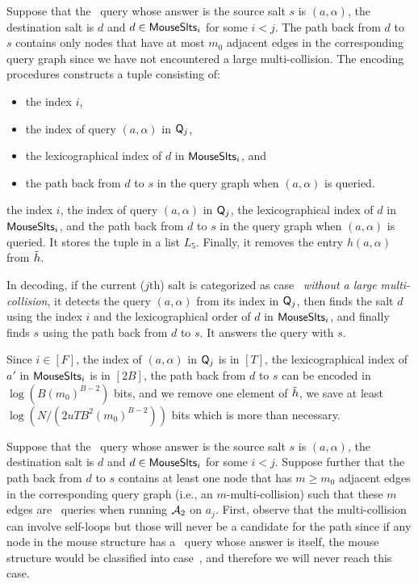  Suppose that the \new\ query whose answer is the source salt $s$ is $(a,\alpha)$, the destination salt is $d$ and  $d\in \mathsf{MouseSlts}_i$ for some $i<j$. The path back from $d$ to $s$ contains only nodes that have at most $m_0$ adjacent edges in the corresponding query graph since we have not encountered a large multi-collision.
The encoding procedures constructs a tuple consisting of\ifnum{}:
\begin{itemize}
  \item the index $i$,
  \item the index of query $(a,\alpha)$ in $\mathsf{Q}_j$,
  \item the lexicographical index of $d$ in $\mathsf{MouseSlts}_i$, and 
  \item the path back from $d$ to $s$ in the query graph when $(a,\alpha)$ is queried.
\end{itemize}
\else
the index $i$,
  the index of query $(a,\alpha)$ in $\mathsf{Q}_j$, the lexicographical index of $d$ in $\mathsf{MouseSlts}_i$, and the path back from $d$ to $s$ in the query graph when $(a,\alpha)$ is queried.
\fi
 It stores the tuple in a list $L_5$. Finally, it removes the entry $h(a,\alpha)$ from $\tilde{h}$.

In decoding, if  the current ($j$th) salt is categorized as case~ \emph{without a large multi-collision}, it  detects the query $(a,\alpha)$ from its index in $\mathsf{Q}_j$, then finds the salt $d$ using the index $i$ and the lexicographical order of $d$ in $\mathsf{MouseSlts}_i$, and finally finds $s$ using the path back from $d$ to $s$. It answers the query with  $s$.

Since $i\in [F]$, the index of $(a,\alpha)$ in $\mathsf{Q}_j$ is in $[T]$, the lexicographical index of $a'$ in $\mathsf{MouseSlts}_i$ is in $[2B]$, the path back from $d$ to $s$ can be encoded in $\log (B(m_0)^{B-2})$ bits, and we remove one element of $\tilde{h}$, we save at least $\log (N/(2uTB^2(m_0)^{B-2}))$ bits which is more than necessary.





Suppose that the \new\ query whose answer is the source salt $s$ is $(a,\alpha)$, the destination salt is $d$ and  $d\in \mathsf{MouseSlts}_i$ for some $i<j$. Suppose further that the path back from $d$ to $s$ contains at least one node that has $m \ge m_0$ adjacent edges in the corresponding query graph (i.e., an $m$-multi-collision) such that these $m$ edges are \urep\ queries when running $\mathcal{A}_2$ on $a_j$.  First, observe that the multi-collision  can involve self-loops but those will never be a candidate for the path
since if any node in the mouse structure has a \urep\ query whose answer is itself, the mouse structure would be classified into case~, and therefore we will never reach this case.

